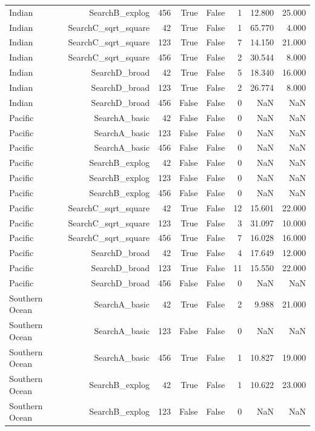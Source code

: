 \begin{longtable}{lrrrrrrr}
Indian & SearchB\_explog & 456 & True & False & 1 & 12.800 & 25.000 \\
Indian & SearchC\_sqrt\_square & 42 & True & False & 1 & 65.770 & 4.000 \\
Indian & SearchC\_sqrt\_square & 123 & True & False & 7 & 14.150 & 21.000 \\
Indian & SearchC\_sqrt\_square & 456 & True & False & 2 & 30.544 & 8.000 \\
Indian & SearchD\_broad & 42 & True & False & 5 & 18.340 & 16.000 \\
Indian & SearchD\_broad & 123 & True & False & 2 & 26.774 & 8.000 \\
Indian & SearchD\_broad & 456 & False & False & 0 & NaN & NaN \\
Pacific & SearchA\_basic & 42 & False & False & 0 & NaN & NaN \\
Pacific & SearchA\_basic & 123 & False & False & 0 & NaN & NaN \\
Pacific & SearchA\_basic & 456 & False & False & 0 & NaN & NaN \\
Pacific & SearchB\_explog & 42 & False & False & 0 & NaN & NaN \\
Pacific & SearchB\_explog & 123 & False & False & 0 & NaN & NaN \\
Pacific & SearchB\_explog & 456 & False & False & 0 & NaN & NaN \\
Pacific & SearchC\_sqrt\_square & 42 & True & False & 12 & 15.601 & 22.000 \\
Pacific & SearchC\_sqrt\_square & 123 & True & False & 3 & 31.097 & 10.000 \\
Pacific & SearchC\_sqrt\_square & 456 & True & False & 7 & 16.028 & 16.000 \\
Pacific & SearchD\_broad & 42 & True & False & 4 & 17.649 & 12.000 \\
Pacific & SearchD\_broad & 123 & True & False & 11 & 15.550 & 22.000 \\
Pacific & SearchD\_broad & 456 & False & False & 0 & NaN & NaN \\
Southern Ocean & SearchA\_basic & 42 & True & False & 2 & 9.988 & 21.000 \\
Southern Ocean & SearchA\_basic & 123 & False & False & 0 & NaN & NaN \\
Southern Ocean & SearchA\_basic & 456 & True & False & 1 & 10.827 & 19.000 \\
Southern Ocean & SearchB\_explog & 42 & True & False & 1 & 10.622 & 23.000 \\
Southern Ocean & SearchB\_explog & 123 & False & False & 0 & NaN & NaN \\

\end{longtable}
